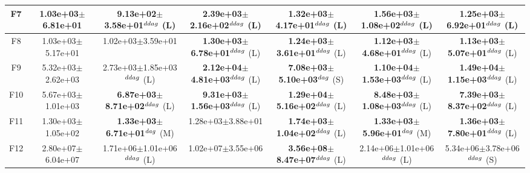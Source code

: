\begin{table}[!t]
\begin{tabular}{c|cccccc}
F7  & 1.03e+03$\pm$6.81e+01  & 9.13e+02$\pm$3.58e+01$^{\\ddag}$ (L)  & \textbf{2.39e+03$\pm$2.16e+02}$^{\\ddag}$ (L)  & \textbf{1.32e+03$\pm$4.17e+01}$^{\\ddag}$ (L)  & \textbf{1.56e+03$\pm$1.08e+02}$^{\\ddag}$ (L)  & \textbf{1.25e+03$\pm$6.92e+01}$^{\\ddag}$ (L) \\ \hline
F8  & 1.03e+03$\pm$5.17e+01  & 1.02e+03$\pm$3.59e+01   & \textbf{1.30e+03$\pm$6.78e+01}$^{\\ddag}$ (L)  & \textbf{1.24e+03$\pm$3.61e+01}$^{\\ddag}$ (L)  & \textbf{1.12e+03$\pm$4.68e+01}$^{\\ddag}$ (L)  & \textbf{1.13e+03$\pm$5.07e+01}$^{\\ddag}$ (L) \\ \hline
F9  & 5.32e+03$\pm$2.62e+03  & 2.73e+03$\pm$1.85e+03$^{\\ddag}$ (L)  & \textbf{2.12e+04$\pm$4.81e+03}$^{\\ddag}$ (L)  & \textbf{7.08e+03$\pm$5.10e+03}$^{\\dag}$ (S)  & \textbf{1.10e+04$\pm$1.53e+03}$^{\\ddag}$ (L)  & \textbf{1.49e+04$\pm$1.15e+03}$^{\\ddag}$ (L) \\ \hline
F10  & 5.67e+03$\pm$1.01e+03  & \textbf{6.87e+03$\pm$8.71e+02}$^{\\ddag}$ (L)  & \textbf{9.31e+03$\pm$1.56e+03}$^{\\ddag}$ (L)  & \textbf{1.29e+04$\pm$5.16e+02}$^{\\ddag}$ (L)  & \textbf{8.48e+03$\pm$1.08e+03}$^{\\ddag}$ (L)  & \textbf{7.39e+03$\pm$8.37e+02}$^{\\ddag}$ (L) \\ \hline
F11  & 1.30e+03$\pm$1.05e+02  & \textbf{1.33e+03$\pm$6.71e+01}$^{\\dag}$ (M)  & 1.28e+03$\pm$3.88e+01   & \textbf{1.74e+03$\pm$1.04e+02}$^{\\ddag}$ (L)  & \textbf{1.33e+03$\pm$5.96e+01}$^{\\dag}$ (M)  & \textbf{1.36e+03$\pm$7.80e+01}$^{\\ddag}$ (L) \\ \hline
F12  & 2.80e+07$\pm$6.04e+07  & 1.71e+06$\pm$1.01e+06$^{\\ddag}$ (L)  & 1.02e+07$\pm$3.55e+06   & \textbf{3.56e+08$\pm$8.47e+07}$^{\\ddag}$ (L)  & 2.14e+06$\pm$1.01e+06$^{\\ddag}$ (L)  & 5.34e+06$\pm$3.78e+06$^{\\ddag}$ (S) \\ \hline

\end{tabular}
\end{table}
